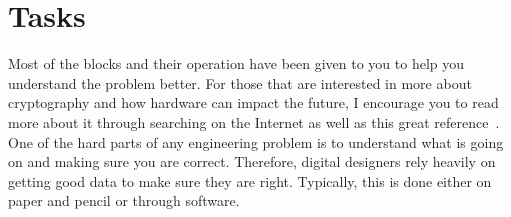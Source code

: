 \documentclass{article}
\begin{document}
  
\section{Tasks}

Most of the blocks and their operation
have been given to you to help you understand the
problem better.
For those that are interested in more about cryptography and how
hardware can impact the future, I encourage you to read more about it
through searching on the Internet as well as this great
reference~\cite{10.5555/1721909}.
One of the hard parts of any engineering problem is
to understand what is going on and making sure you are correct.
Therefore, digital designers rely heavily on getting good data to make
sure they are right.  Typically, this is done either on paper and
pencil or through software.
\end{document}
